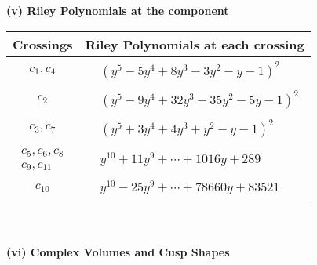 \documentclass[1p]{elsarticle_modified}
\theoremstyle{definition}
\begin{document}
\newpage\renewcommand{\arraystretch}{1}
\flushleft \textbf{(v) Riley Polynomials at the component}\newline \\
\begin{tabular}{m{50pt}|m{274pt}}
Crossings & \hspace{64pt}Riley Polynomials at each crossing \\
\hline $$\begin{aligned}c_{1},c_{4}\end{aligned}$$&$\begin{aligned}
&(y^5-5 y^4+8 y^3-3 y^2- y-1)^2
\end{aligned}$\\
\hline $$\begin{aligned}c_{2}\end{aligned}$$&$\begin{aligned}
&(y^5-9 y^4+32 y^3-35 y^2-5 y-1)^2
\end{aligned}$\\
\hline $$\begin{aligned}c_{3},c_{7}\end{aligned}$$&$\begin{aligned}
&(y^5+3 y^4+4 y^3+y^2- y-1)^2
\end{aligned}$\\
\hline $$\begin{aligned}c_{5},c_{6},c_{8}\\c_{9},c_{11}\end{aligned}$$&$\begin{aligned}
&y^{10}+11 y^9+\cdots+1016 y+289
\end{aligned}$\\
\hline $$\begin{aligned}c_{10}\end{aligned}$$&$\begin{aligned}
&y^{10}-25 y^9+\cdots+78660 y+83521
\end{aligned}$\\
\hline
\end{tabular}\\~\\
\newpage\flushleft \textbf{(vi) Complex Volumes and Cusp Shapes}
\end{document}
